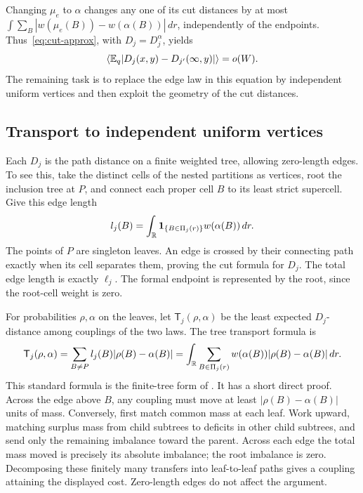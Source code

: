 Changing $\mu_e$ to $\alpha$ changes any one of its cut distances by
at most $\int\sum_B|w(\mu_e(B))-w(\alpha(B))|\,dr$, independently
of the endpoints. Thus~\eqref{eq:cut-approx}, with
$D_j=D_j^\alpha$, yields
\begin{equation}\label{eq:fiber-tree}
 \left\langle \mathbb E_q|D_j(x,y)-D_{j'}(\infty,y)|\right\rangle=o(W).
\end{equation}
The remaining task is to replace the edge law in this equation by
independent uniform vertices and then exploit the geometry of the
cut distances.

\subsection{Transport to independent uniform vertices}

Each $D_j$ is the path distance on a finite weighted tree, allowing
zero-length edges. To see this, take the distinct cells of the nested
partitions as vertices, root the inclusion tree at $P$, and connect
each proper cell $B$ to its least strict supercell. Give this edge
length
\[
 l_j(B)=\int_{\mathbb R}\mathbf 1_{\{B\in\Pi_j(r)\}}w(\alpha(B))\,dr.
\]
The points of $P$ are singleton leaves. An edge is crossed by their
connecting path exactly when its cell separates them, proving the
cut formula for $D_j$. The total edge length is exactly $\ell_j$.
The formal endpoint is represented by the root, since the root-cell
weight is zero.

For probabilities $\rho,\alpha$ on the leaves, let
$\mathsf T_j(\rho,\alpha)$ be the least expected $D_j$-distance among
couplings of the two laws. The tree transport formula is
\begin{equation}\label{eq:unb-transport}
 \mathsf T_j(\rho,\alpha)
 =\sum_{B\ne P}l_j(B)|\rho(B)-\alpha(B)|
 =\int_{\mathbb R}\sum_{B\in\Pi_j(r)}
       w(\alpha(B))|\rho(B)-\alpha(B)|\,dr.
\end{equation}
This standard formula is the finite-tree form of
\cite[Section~2, Equation~(5)]{TreeTransport}. It has a
short direct proof. Across the edge above $B$, any coupling must move
at least $|\rho(B)-\alpha(B)|$ units of mass. Conversely, first match
common mass at each leaf. Work upward, matching surplus mass from child
subtrees to deficits in other child subtrees, and send only the
remaining imbalance toward the parent. Across each edge the total
mass moved is precisely its absolute imbalance; the root imbalance
is zero. Decomposing these finitely many transfers into leaf-to-leaf
paths gives a coupling attaining the displayed cost. Zero-length
edges do not affect the argument.

